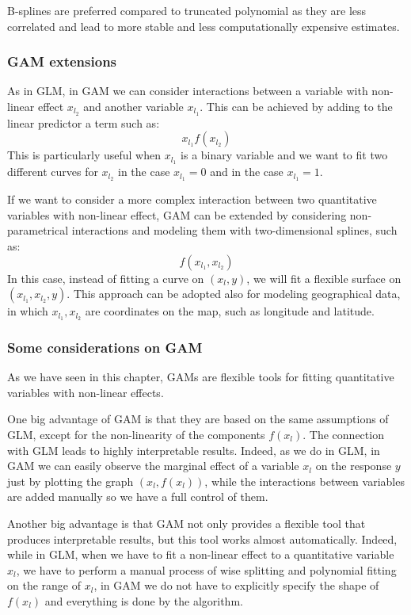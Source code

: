 \documentclass[a4paper, nobind]{templates/ociamthesis}
\theoremstyle{definition}
\theoremstyle{definition}
\theoremstyle{definition}
\theoremstyle{remark}
\begin{document}
B-splines are preferred compared to truncated polynomial as they are less correlated and lead to more stable and less computationally expensive estimates.

\hypertarget{gam-extensions}{%
\subsubsection{GAM extensions}\label{gam-extensions}}

As in GLM, in GAM we can consider interactions between a variable with non-linear effect \(x_{l_2}\) and another variable \(x_{l_1}\). This can be achieved by adding to the linear predictor a term such as:
\[
x_{l_1} f(x_{l_2})
\]
This is particularly useful when \(x_{l_1}\) is a binary variable and we want to fit two different curves for \(x_{l_2}\) in the case \(x_{l_1}=0\) and in the case \(x_{l_1}=1\).

If we want to consider a more complex interaction between two quantitative variables with non-linear effect, GAM can be extended by considering non-parametrical interactions and modeling them with two-dimensional splines, such as:
\[
f(x_{l_1}, x_{l_2})
\]
In this case, instead of fitting a curve on \((x_l, y)\), we will fit a flexible surface on \((x_{l_1}, x_{l_2}, y)\). This approach can be adopted also for modeling geographical data, in which \(x_{l_1}, x_{l_2}\) are coordinates on the map, such as longitude and latitude.

\hypertarget{some-considerations-on-gam}{%
\subsubsection{Some considerations on GAM}\label{some-considerations-on-gam}}

As we have seen in this chapter, GAMs are flexible tools for fitting quantitative variables with non-linear effects.

One big advantage of GAM is that they are based on the same assumptions of GLM, except for the non-linearity of the components \(f(x_{l})\). The connection with GLM leads to highly interpretable results. Indeed, as we do in GLM, in GAM we can easily observe the marginal effect of a variable \(x_l\) on the response \(y\) just by plotting the graph \(\left(x_l, f(x_l)\right)\), while the interactions between variables are added manually so we have a full control of them.

Another big advantage is that GAM not only provides a flexible tool that produces interpretable results, but this tool works almost automatically. Indeed, while in GLM, when we have to fit a non-linear effect to a quantitative variable \(x_l\), we have to perform a manual process of wise splitting and polynomial fitting on the range of \(x_l\), in GAM we do not have to explicitly specify the shape of \(f(x_l)\) and everything is done by the algorithm.
\end{document}
